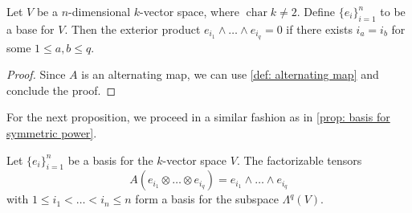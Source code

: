 \begin{proposition}
  Let \(V\) be a \(n\)-dimensional \(k\)-vector space, where
  \(\operatorname{char} k \neq 2\). Define \(\{e_i\}_{i=1}^n\) to be a base for
  \(V\). Then the exterior product \(e_{i_1} \wedge \dots \wedge e_{i_q} = 0\)
  if there exists \(i_a = i_b\) for some \(1 \leq a, b \leq q\).
\end{proposition}

\begin{proof}
  Since \(A\) is an alternating map, we can use \cref{def: alternating map} and
  conclude the proof.
\end{proof}

For the next proposition, we proceed in a similar fashion as in \cref{prop:
basis for symmetric power}.

\begin{proposition}
  \label{prop: exterior power basis}
  Let \(\{e_i\}_{i=1}^n\) be a basis for the \(k\)-vector space \(V\). The
  factorizable tensors
  \[
    A(e_{i_1} \otimes \dots \otimes e_{i_q}) = e_{i_1} \wedge \dots \wedge
    e_{i_q}
  \]
  with \(1 \leq i_1 < \dots < i_n \leq n\) form a basis for the subspace
  \(\Lambda^q(V)\).
\end{proposition}

